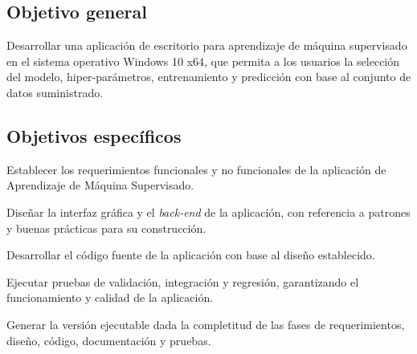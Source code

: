 \subsection{Objetivo general}
Desarrollar una aplicación de escritorio para aprendizaje de máquina supervisado en el sistema operativo Windows 10 x64, que permita a los usuarios la selección del modelo, hiper-parámetros, entrenamiento y predicción con base al conjunto de datos suministrado. 

\subsection{Objetivos específicos}
\begin{APAitemize}
    \item Establecer los requerimientos funcionales y no funcionales de la aplicación de Aprendizaje de Máquina Supervisado.
    \item Diseñar la interfaz gráfica y el \textit{back-end} de la aplicación, con referencia a patrones y buenas prácticas para su construcción.
    \item Desarrollar el código fuente de la aplicación con base al diseño establecido. 
    \item Ejecutar pruebas de validación, integración y regresión, garantizando el funcionamiento y calidad de la aplicación.
    \item Generar la versión ejecutable dada la completitud de las fases de requerimientos, diseño, código, documentación y pruebas.
\end{APAitemize}


